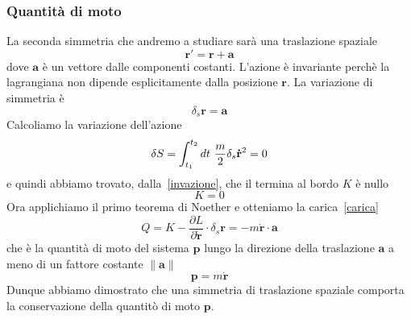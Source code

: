 \begin{example}
    \subsubsection{Quantità di moto}
        La seconda simmetria che andremo a studiare sarà una traslazione spaziale
    \begin{equation}
        \mathbf r' = \mathbf r + \mathbf a
    \end{equation}
        dove $\mathbf a$ è un vettore dalle componenti costanti. L'azione è invariante perchè la lagrangiana non dipende esplicitamente dalla posizione $\mathbf r$. La variazione di simmetria è 
    \begin{equation*}
        \delta_s \mathbf r = \mathbf a
    \end{equation*}
        Calcoliamo la variazione dell'azione
    \begin{equation}
        \delta S = \int_{t_1}^{t_2}dt~ \frac{m}{2} \delta_s \mathbf{\dot r}^2 = 0
    \end{equation}
        e quindi abbiamo trovato, dalla~\eqref{invazione}, che il termina al bordo $K$ è nullo
    \begin{equation*}
        K = 0
    \end{equation*}
        Ora applichiamo il primo teorema di Noether e otteniamo la carica~\eqref{carica} 
    \begin{equation}
        Q = K - \frac{\partial L}{\partial \mathbf{\dot r}} \cdot \delta_s \mathbf r = - m \mathbf{\dot r} \cdot \mathbf a
    \end{equation}
        che è la quantità di moto del sistema $\mathbf p$ lungo la direzione della traslazione $\mathbf a$ a meno di un fattore costante $\|\mathbf a \|$
    \begin{equation*}
        \mathbf p = m \mathbf{\dot r}
    \end{equation*}
        Dunque abbiamo dimostrato che una simmetria di traslazione spaziale comporta la conservazione della quantitò di moto $\mathbf p$.


\end{example}
